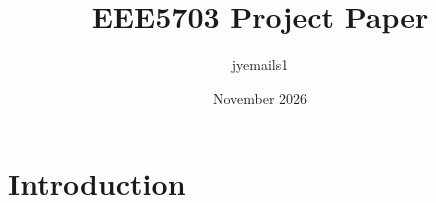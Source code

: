 \documentclass{article}
\title{EEE5703 Project Paper}
\author{jyemails1 }
\date{November 2026}
\begin{document}
\maketitle

\section{Introduction}
\end{document}
